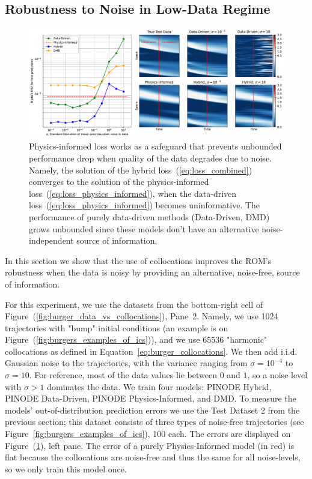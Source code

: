 \subsection{Robustness to Noise in Low-Data Regime}
\label{sec:burger_noise}
\begin{figure}[t]
    \centering
    \includegraphics[width=\textwidth]{figures/burgers_noise.pdf}
    \caption{Physics-informed loss works as a safeguard that prevents unbounded performance drop when quality of the data degrades due to noise. Namely, the solution of the hybrid loss~(\ref{eq:loss_combined}) converges to the solution of the physics-informed loss~(\ref{eq:loss_physics_informed}), when the data-driven loss~(\ref{eq:loss_physics_informed}) becomes uninformative. The performance of purely data-driven methods (Data-Driven, DMD) grows unbounded since these models don't have an alternative noise-independent source of information.}
    \label{fig:burger_noise}
\end{figure}

In this section we show that the use of collocations improves the ROM's robustness when the data is noisy by providing an alternative, noise-free, source of information.

For this experiment, we use the datasets from the bottom-right cell of Figure~(\ref{fig:burger_data_vs_collocations}), Pane~2. Namely, we use 1024 trajectories with "bump" initial conditions (an example is on Figure~(\ref{fig:burgers_examples_of_ics})), and we use 65536 "harmonic" collocations as defined in Equation~\ref{eq:burger_collocations}. We then add i.i.d. Gaussian noise to the trajectories, with the variance ranging from $\sigma = 10^{-4}$ to $\sigma = 10$. For reference, most of the data values lie between $0$ and $1$, so a noise level with $\sigma > 1$ dominates the data. We train four models: PINODE Hybrid, PINODE Data-Driven, PINODE Physics-Informed, and DMD. To measure the models' out-of-distribution prediction errors we use the Test Dataset 2 from the previous section; this dataset consists of three types of noise-free trajectories (see Figure~\ref{fig:burgers_examples_of_ics}), 100 each. The errors are displayed on Figure~(\ref{fig:burger_noise}), left pane. The error of a purely Physics-Informed model (in red) is flat because the collocations are noise-free and thus the same for all noise-levels, so we only train this model once. 

